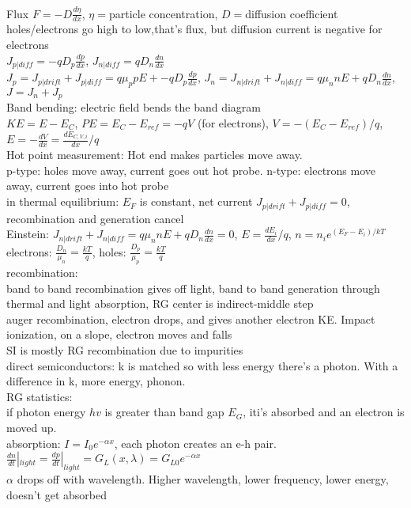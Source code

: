 \documentclass{article}
\begin{document}
\begin{large}
\\Flux $F=-D\frac{d\eta}{dx}$, $\eta=$particle concentration, $D=$diffusion coefficient
\\holes/electrons go high to low,that's flux, but diffusion current is negative for electrons
\\$J_{p|diff}=-qD_p\frac{dp}{dx}$, $J_{n|diff}=qD_n\frac{dn}{dx}$
\\$J_p=J_{p|drift}+J_{p|diff}=q\mu_ppE+-qD_p\frac{dp}{dx}$, $J_n=J_{n|drift}+J_{n|diff}=q\mu_nnE+qD_n\frac{dn}{dx}$, $J=J_n+J_p$
\\Band bending: electric field bends the band diagram
\\$KE=E-E_C$, $PE=E_C-E_{ref}=-qV$ (for electrons), $V=-(E_C-E_{ref})/q$, $E=-\frac{dV}{dx}=\frac{dE_{C,V,i}}{dx}/q$
\\Hot point measurement: Hot end makes particles move away. 
\\p-type: holes move away, current goes out hot probe. n-type: electrons move away, current goes into hot probe
\\in thermal equilibrium: $E_F$ is constant, net current $J_{p|drift}+J_{p|diff}=0$, recombination and generation cancel
\\Einstein: $J_{n|drift}+J_{n|diff}=q\mu_nnE+qD_n\frac{dn}{dx}=0$, $E=\frac{dE_i}{dx}/q$, $n=n_ie^{(E_F-E_i)/kT}$
\\electrons: $\frac{D_n}{\mu_n}=\frac{kT}{q}$, holes: $\frac{D_p}{\mu_p}=\frac{kT}{q}$
\\recombination:
\\band to band recombination gives off light, band to band generation through thermal and light absorption, RG center is indirect-middle step
\\auger recombination, electron drops, and gives another electron KE. Impact ionization, on a slope, electron moves and falls
\\SI is mostly RG recombination due to impurities
\\direct semiconductors: k is matched so with less energy there's a photon. With a difference in k, more energy, phonon.
\\RG statistics:
\\if photon energy $hv$ is greater than band gap $E_G$, iti's absorbed and an electron is moved up.
\\absorption: $I=I_0e^{-\alpha x}$, each photon creates an e-h pair. $\frac{dn}{dt}|_{light}=\frac{dp}{dt}|_{light}=G_L(x,\lambda)=G_{L0}e^{-\alpha x}$
\\$\alpha$ drops off with wavelength. Higher wavelength, lower frequency, lower energy, doesn't get absorbed

\end{large}
\end{document}
